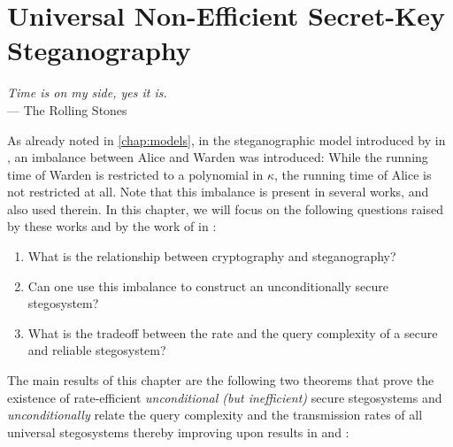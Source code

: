 \chapter{Universal Non-Efficient Secret-Key Steganography}
\label{chap:universal_nonefficient_secret}
\begin{flushright}{\slshape    
Time is on my side, yes it is.} \\ \medskip
    --- The Rolling Stones
\end{flushright}

As already noted in \autoref{chap:models}, in the steganographic model
introduced by \citeauthor{hopper2009provably} in
\cite{hopper2009provably}, an imbalance between Alice and Warden was
introduced: While the running time of Warden is restricted to a
polynomial in $\kappa$, the running time of Alice is not restricted at
all. Note that this imbalance is present in several works, \eg
\cite{hopper2002provably, hopper2009provably, hopper2004toward} and also
used therein. In this chapter, we will focus on the following questions
raised by these works and by the work of \citeauthor{dedic2009lower}
in \cite{dedic2009lower}:
\begin{enumerate}
\item What is the relationship between cryptography and steganography?
\item Can one use this imbalance to construct an unconditionally secure
  stegosystem?
\item What is the tradeoff between  the rate and the query
  complexity of a secure and reliable stegosystem?
\end{enumerate}

The main results of this chapter are the following two theorems that
prove the existence of rate-efficient \emph{unconditional (but inefficient)} secure stegosystems
and \emph{unconditionally} relate the query complexity and the transmission
rates of all universal stegosystems thereby improving upon results in
\cite{hopper2009provably} and \cite{dedic2009lower}:

